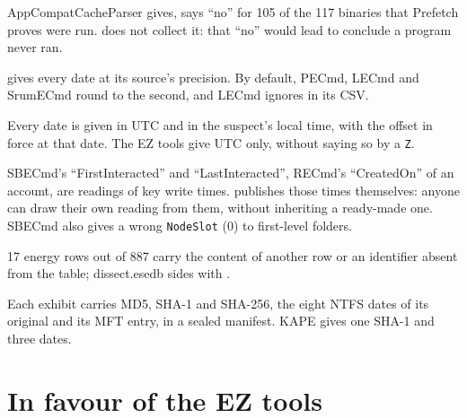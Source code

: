 \documentclass[11pt,a4paper,oneside]{report}
\begin{document}
\begin{description}[style=nextline,leftmargin=1em]
        AppCompatCacheParser gives, says ``no'' for 105 of the 117 binaries that
        Prefetch proves were run. \wac{} does not collect it: that ``no'' would
        lead to conclude a program never ran.
  \item[Precision to 100\,ns] \wac{} gives every date at its source's
        precision. By default, PECmd, LECmd and SrumECmd round to the second, and
        LECmd ignores  in its CSV.
  \item[Dated local time] Every date is given in UTC and in the suspect's local
        time, with the offset in force at that date. The EZ tools give UTC only,
        without saying so by a \texttt{Z}.
  \item[Others' readings checked] SBECmd's ``FirstInteracted'' and
        ``LastInteracted'', RECmd's ``CreatedOn'' of an account, are readings of
        key write times. \wac{} publishes those times themselves: anyone can draw
        their own reading from them, without inheriting a ready-made one.
        SBECmd also gives a wrong \texttt{NodeSlot} (0) to first-level folders.
  \item[SrumECmd's ESE reading errors] 17 energy rows out of 887 carry the
        content of another row or an identifier absent from the table;
        dissect.esedb sides with \wac{}.
  \item[Collection] Each \wac{} exhibit carries MD5, SHA-1 and SHA-256, the
        eight NTFS dates of its original and its MFT entry, in a sealed manifest.
        KAPE gives one SHA-1 and three dates.
\end{description}

\section{In favour of the EZ tools}\label{sec:coverage}
\end{document}
